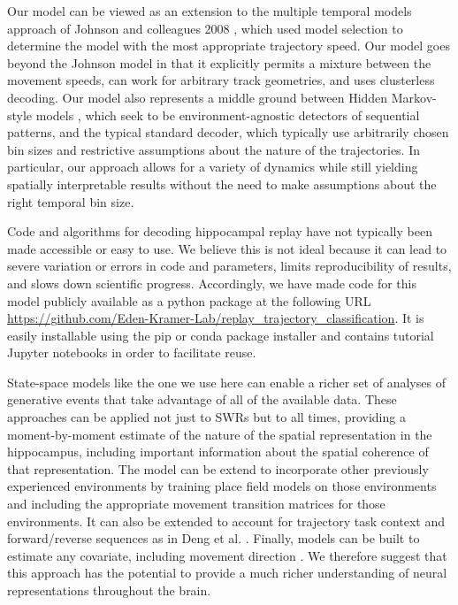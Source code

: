 \documentclass[times, twoside]{zHenriquesLab-StyleBioRxiv}
\begin{document}
Our model can be viewed as an extension to the multiple temporal models approach of Johnson and colleagues 2008 \cite{JohnsonMeasuringdistributedproperties2008}, which used model selection to determine the model with the most appropriate trajectory speed. Our model goes beyond the Johnson model in that it explicitly permits a mixture between the movement speeds, can work for arbitrary track geometries, and uses clusterless decoding. Our model also represents a middle ground between Hidden Markov-style models \cite{MaboudiUncoveringtemporalstructure2018, ChenBayesiannonparametricmethods2016, LindermanBayesiannonparametricapproach2016, ChenUncoveringspatialtopology2012}, which seek to be environment-agnostic detectors of sequential patterns, and the typical standard decoder, which typically use arbitrarily chosen bin sizes and restrictive assumptions about the nature of the trajectories. In particular, our approach allows for a variety of dynamics while still yielding spatially interpretable results without the need to make assumptions about the right temporal bin size.

Code and algorithms for decoding hippocampal replay have not typically been made accessible or easy to use. We believe this is not ideal because it can lead to severe variation or errors in code and parameters, limits reproducibility of results, and slows down scientific progress. Accordingly, we have made code for this model publicly available as a python package at the following URL \url{https://github.com/Eden-Kramer-Lab/replay_trajectory_classification}. It is easily installable using the pip or conda package installer and contains tutorial Jupyter notebooks in order to facilitate reuse.

State-space models like the one we use here can enable a richer set of analyses of generative events that take advantage of all of the available data. These approaches can be applied not just to SWRs but to all times, providing a moment-by-moment estimate of the nature of the spatial representation in the hippocampus, including important information about the spatial coherence of that representation. The model can be extend to incorporate other previously experienced environments by training place field models on those environments and including the appropriate movement transition matrices for those environments. It can also be extended to account for trajectory task context and forward/reverse sequences as in Deng et al. \cite{DengRapidclassificationhippocampal2016}. Finally, models can be built to estimate any covariate, including movement direction \cite{KayConstantSubsecondCycling2020}. We therefore suggest that this approach has the potential to provide a much richer understanding of neural representations throughout the brain. 
\end{document}
